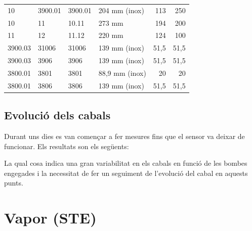 \documentclass[11pt]{article}
\begin{document}
\begin{table}[htbp]
{\begin{tabular}{llllrr}
            10              & 3900.01             & 3900.01       & 204 mm (inox)     & 113                                          & 250                                         \\
            10              & 11                  & 10.11         & 273 mm            & 194                                          & 200                                         \\
            11              & 12                  & 11.12         & 220 mm            & 124                                          & 100                                         \\
            3900.03         & 31006               & 31006         & 139 mm (inox)     & 51,5                                         & 51,5                                        \\
            3900.03         & 3906                & 3906          & 139 mm (inox)     & 51,5                                         & 51,5                                        \\
            3800.01         & 3801                & 3801          & 88,9 mm (inox)    & 20                                           & 20                                          \\
            3800.01         & 3806                & 3806          & 139 mm (inox)     & 51,5                                         & 51,5                                        \\
            \bottomrule
        \end{tabular}
    }
\end{table}

\subsection{Evolució dels cabals}

Durant uns dies es van començar a fer mesures fins que el sensor va deixar de funcionar. Els resultats son els següents:

La qual cosa indica una gran variabilitat en els cabals en funció de les bombes engegades i la necessitat de fer un seguiment de l'evolució del cabal en aquests punts.


\section{Vapor (STE)}
\end{document}
